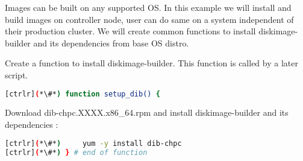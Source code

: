 
	Images can be built on any supported OS. In this example we will install and build images on controller node, user can do same on a system independent of their production cluster. We will create common functions to install diskimage-builder and its dependencies from base OS distro.

	Create a function to install diskimage-builder. This function is called by a later script. 

\begin{lstlisting}[language=bash,keywords={}]
[ctrlr](*\#*) function setup_dib() {
\end{lstlisting}
	Download dib-chpc.XXXX.x86\_64.rpm and install diskimage-builder and its dependencies :
\begin{lstlisting}[language=bash,keywords={}]
[ctrlr](*\#*)     yum -y install dib-chpc
[ctrlr](*\#*) } # end of function
\end{lstlisting}
